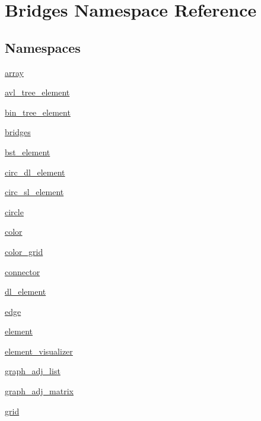 \hypertarget{namespace_bridges}{}\section{Bridges Namespace Reference}
\label{namespace_bridges}
\subsection*{Namespaces}
\begin{DoxyCompactItemize}
\item 
 \mbox{\hyperlink{namespace_bridges_1_1array}{array}}
\item 
 \mbox{\hyperlink{namespace_bridges_1_1avl__tree__element}{avl\+\_\+tree\+\_\+element}}
\item 
 \mbox{\hyperlink{namespace_bridges_1_1bin__tree__element}{bin\+\_\+tree\+\_\+element}}
\item 
 \mbox{\hyperlink{namespace_bridges_1_1bridges}{bridges}}
\item 
 \mbox{\hyperlink{namespace_bridges_1_1bst__element}{bst\+\_\+element}}
\item 
 \mbox{\hyperlink{namespace_bridges_1_1circ__dl__element}{circ\+\_\+dl\+\_\+element}}
\item 
 \mbox{\hyperlink{namespace_bridges_1_1circ__sl__element}{circ\+\_\+sl\+\_\+element}}
\item 
 \mbox{\hyperlink{namespace_bridges_1_1circle}{circle}}
\item 
 \mbox{\hyperlink{namespace_bridges_1_1color}{color}}
\item 
 \mbox{\hyperlink{namespace_bridges_1_1color__grid}{color\+\_\+grid}}
\item 
 \mbox{\hyperlink{namespace_bridges_1_1connector}{connector}}
\item 
 \mbox{\hyperlink{namespace_bridges_1_1dl__element}{dl\+\_\+element}}
\item 
 \mbox{\hyperlink{namespace_bridges_1_1edge}{edge}}
\item 
 \mbox{\hyperlink{namespace_bridges_1_1element}{element}}
\item 
 \mbox{\hyperlink{namespace_bridges_1_1element__visualizer}{element\+\_\+visualizer}}
\item 
 \mbox{\hyperlink{namespace_bridges_1_1graph__adj__list}{graph\+\_\+adj\+\_\+list}}
\item 
 \mbox{\hyperlink{namespace_bridges_1_1graph__adj__matrix}{graph\+\_\+adj\+\_\+matrix}}
\item 
 \mbox{\hyperlink{namespace_bridges_1_1grid}{grid}}

\end{DoxyCompactItemize}
